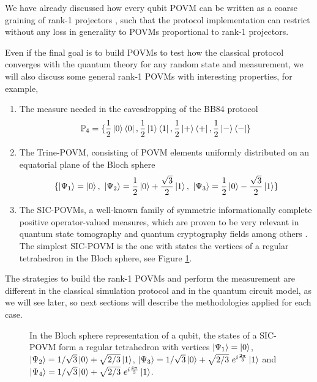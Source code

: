 We have already discussed how every qubit POVM can be written as a coarse graining of rank-1 projectors \cite{barrett2002}, such that the protocol implementation can restrict without any loss in generality to POVMs proportional to rank-1 projectors. 

Even if the final goal is to build POVMs to test how the classical protocol converges with the quantum theory for any random state and measurement, we will also discuss some general rank-1 POVMs with interesting properties, for example, 
\begin{enumerate}
    \item The measure needed in the eavesdropping  of the BB84 protocol \cite{nielsen2000}
\begin{equation}
    \mathbb{P}_4 = \{\frac{1}{2}\ket{0}\bra{0}, \frac{1}{2}\ket{1}\bra{1}, \frac{1}{2}\ket{+}\bra{+}, \frac{1}{2}\ket{-}\bra{-} \}
\end{equation}
    \item The Trine-POVM, consisting of POVM elements uniformly distributed on an equatorial plane of the Bloch sphere
\begin{equation}
\{\ket{\Psi_1}=\ket{0},\ \ket{\Psi_2}=\frac{1}{2}\ket{0} + \frac{\sqrt{3}}{2} \ket{1},\ \ket{\Psi_3}=\frac{1}{2}\ket{0} - \frac{\sqrt{3}}{2} \ket{1}\}
\end{equation}
    \item The SIC-POVMs, a well-known family of symmetric informationally complete positive operator-valued measures, which are proven to be very relevant in quantum state tomography and quantum cryptography fields among others \cite{renes2004}. The simplest SIC-POVM is the one with states the vertices of a regular tetrahedron in the Bloch sphere, see Figure \ref{fig:sic_povm}.
\end{enumerate}

The strategies to build the rank-1 POVMs and perform the measurement are different in the classical simulation protocol and in the quantum circuit model, as we will see later, so next sections will describe the methodologies applied for each case.

\begin{figure}[!ht]
\begin{center}
\centerline{}
\caption[SIC-POVM as tetrahedron in Bloch sphere]%
{\label{fig:sic_povm}%
In the Bloch sphere representation of a qubit, the states of a SIC-POVM form a regular tetrahedron with vertices $\ket{\Psi_1}=\ket{0}$, $\ket{\Psi_2}=1/{\sqrt{3}}\ket{0} + \sqrt{2/3} \ket{1}$, $\ket{\Psi_3}=1/{\sqrt{3}}\ket{0} + \sqrt{2/3} \ e^{i\frac{2\pi}{3}} \ket{1}$ and $\ket{\Psi_4}=1/{\sqrt{3}}\ket{0} + \sqrt{2/3}\ e^{i\frac{4\pi}{3}} \ket{1}$.}
\end{center}
\end{figure}

